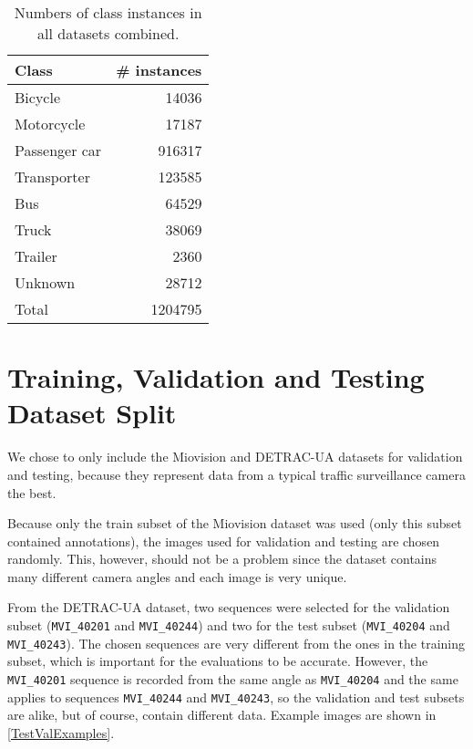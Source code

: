 \begin{table}[h]
\centering
\begin{tabular}{|l|r|}
    \hline
    Class         & \# instances \\
    \hline
    Bicycle       &  \num{14036} \\
    Motorcycle    &  \num{17187} \\
    Passenger car & \num{916317} \\
    Transporter   & \num{123585} \\
    Bus           &  \num{64529} \\
    Truck         &  \num{38069} \\
    Trailer       &   \num{2360} \\
    Unknown       &  \num{28712} \\
    \hline
    \hline
    Total         & \num{1204795} \\
    \hline
\end{tabular}
\caption{Numbers of class instances in all datasets combined.}
\label{DatasetsCounts}
\end{table}


\section{Training, Validation and Testing Dataset Split}

We chose to only include the Miovision and DETRAC-UA datasets for validation and
testing, because they represent data from a typical traffic surveillance camera
the best. 

Because only the train subset of the Miovision dataset was used (only this
subset contained annotations), the images used for validation and testing are
chosen randomly. This, however, should not be a problem since the dataset
contains many different camera angles and each image is very unique.

From the DETRAC-UA dataset, two sequences were selected for the validation
subset (\texttt{MVI\_40201} and \texttt{MVI\_40244}) and two for the test subset
(\texttt{MVI\_40204} and \texttt{MVI\_40243}). The chosen sequences are very
different from the ones in the training subset, which is important for the
evaluations to be accurate. However, the \texttt{MVI\_40201} sequence is
recorded from the same angle as \texttt{MVI\_40204} and the same applies to
sequences \texttt{MVI\_40244} and \texttt{MVI\_40243}, so the validation and
test subsets are alike, but of course, contain different data. Example images
are shown in \autoref{TestValExamples}.


